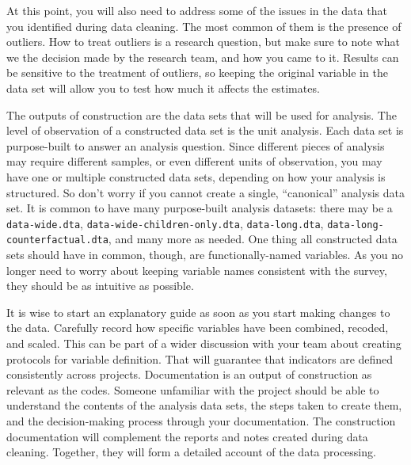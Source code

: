 At this point, you will also need to address some of the issues in the data that you identified during data cleaning. 
The most common of them is the presence of outliers.
How to treat outliers is a research question, but make sure to note what we the decision made by the research team, and how you came to it. 
Results can be sensitive to the treatment of outliers, so keeping the original variable in the data set will allow you to test how much it affects the estimates.


The outputs of construction are the data sets that will be used for analysis.
The level of observation of a constructed data set is the unit analysis. 
Each data set is purpose-built to answer an analysis question.
Since different pieces of analysis may require different samples,
or even different units of observation,
you may have one or multiple constructed data sets, 
depending on how your analysis is structured.
So don't worry if you cannot create a single, ``canonical'' analysis data set.
It is common to have many purpose-built analysis datasets:
there may be a \texttt{data-wide.dta},
\texttt{data-wide-children-only.dta}, \texttt{data-long.dta},
\texttt{data-long-counterfactual.dta}, and many more as needed.
One thing all constructed data sets should have in common, though,
are functionally-named variables.
As you no longer need to worry about keeping variable names
consistent with the survey, they should be as intuitive as possible.

It is wise to start an explanatory guide as soon as you start making changes to the data.
Carefully record how specific variables have been combined, recoded, and scaled. 
This can be part of a wider discussion with your team about creating protocols for variable definition.
That will guarantee that indicators are defined consistently across projects.
Documentation is an output of construction as relevant as the codes.
Someone unfamiliar with the project should be able to understand the contents of the analysis data sets, the steps taken to create them, and the decision-making process through your documentation.
The construction documentation will complement the reports and notes created during data cleaning.
Together, they will form a detailed account of the data processing.




